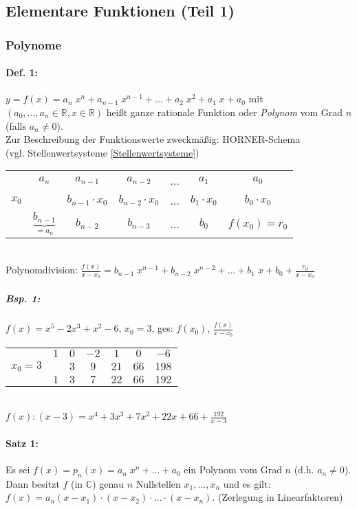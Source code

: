 \subsection{Elementare Funktionen (Teil 1)}
\subsubsection{Polynome}
\paragraph{Def. 1:} \parskp
$y=f(x)=a_n\; x^n+a_{n-1}\;x^{n-1}+...+a_2\; x^2+a_1\; x+a_0$ mit $(a_0, ..., a_n \in \mathbb{R}, x\in \mathbb{R})$ heißt ganze rationale Funktion oder \emph{Polynom} vom Grad $n$ (falls $a_n \not = 0$).\\
Zur Beschreibung der Funktionswerte zweckmäßig: HORNER-Schema\\
(vgl. Stellenwertsysteme  \ref{Stellenwertsysteme})\\
\begin{tabular}{r | c c c c c c}
 & $a_n$ & $a_{n-1}$ & $ a_{n-2}$ & ... & $a_1$ & $a_0$\\
$x_0$ &  & $b_{n-1}\cdot x_0$ & $b_{n-2}\cdot x_0$ & ... & $b_1 \cdot x_0$ & $b_0\cdot x_0$ \\
\hline
 & $\underbrace{\boxed{b_{n-1}}}_{=a_n}$ & $\boxed{b_{n-2}}$ & $\boxed{b_{n-3}}$ & ... & $\boxed{b_0}$ & $f(x_0)=r_0$\\
\end{tabular}\\
Polynomdivision: $\frac{f(x)}{x-x_0}=b_{n-1}\;x^{n-1}+b_{n-2}\;x^{n-2}+...+b_1\; x + b_0 + \frac{r_0}{x-x_0}$

\subparagraph{Bsp. 1:} \parskp
$f(x)=x^5-2x^3+x^2-6$, \quad $x_0=3$, \quad ges: $f(x_0)$, \quad$\frac{f(x)}{x-x_0}$\\
\begin{tabular}{r| c c c c c c}
 & $1$ & $0$ & $-2$ & $1$ & $0$ & $-6$\\
$x_0=3$ &  & $3$ & $9$ & $21$ & $66$ & $198$ \\
\hline
 & $1$ & $3$ & $7$ & $22$ & $66$ & $192$\\
\end{tabular}\\
$f(x):(x-3)=x^4+3 x^3 + 7x^2+22x + 66 + \frac{192}{x-3}$

\paragraph{Satz 1:} \parskp
Es sei $f(x)=p_n(x) = a_n \; x^n + ... + a_0$ ein Polynom vom Grad $n$ (d.h. $a_n\not = 0$). Dann besitzt $f$ (in $\mathbb{C}$) genau $n$ Nullstellen $x_1,...,x_n$ und es gilt: $f(x) = a_n (x-x_1)\cdot (x-x_2)\cdot ... \cdot (x-x_n)$. (Zerlegung in Linearfaktoren)

